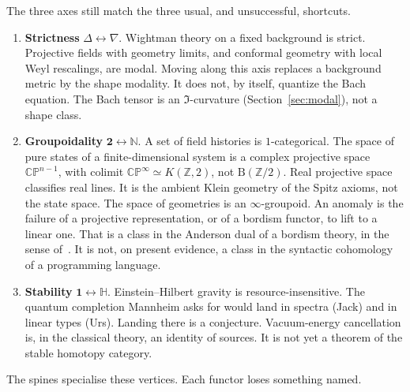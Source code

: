 \documentclass{article}
\theoremstyle{definition}
\begin{document}
The three axes still match the three usual, and unsuccessful, shortcuts.

\begin{enumerate}[label=\arabic*.]
  \item \textbf{Strictness} \(\Delta\leftrightarrow\nabla\).
        Wightman theory on a fixed background is strict.  Projective fields
        with geometry limits, and conformal geometry with local Weyl
        rescalings, are modal.  Moving along this axis replaces a background
        metric by the shape modality.  It does not, by itself, quantize the
        Bach equation.  The Bach tensor is an \(\Im\)-curvature
        (Section~\ref{sec:modal}), not a shape class.
  \item \textbf{Groupoidality} \(\mathbf{2}\leftrightarrow\mathbb{N}\).
        A set of field histories is \(1\)-categorical.  The space of pure
        states of a finite-dimensional system is a complex projective space
        \(\mathbb{CP}^{n-1}\), with colimit
        \(\mathbb{CP}^{\infty}\simeq K(\mathbb{Z},2)\), not
        \(\mathrm{B}(\mathbb{Z}/2)\).  Real projective space classifies real
        lines.  It is the ambient Klein geometry of the Spitz axioms, not the
        state space.  The space of geometries is an \(\infty\)-groupoid.  An anomaly is the failure of a projective
        representation, or of a bordism functor, to lift to a linear one.  That
        is a class in the Anderson dual of a bordism theory, in the sense
        of~\cite{FreedHopkins}.  It is not, on present evidence, a class in
        the syntactic cohomology of a programming language.
  \item \textbf{Stability} \(\mathbf{1}\leftrightarrow\mathbb{H}\).
        Einstein--Hilbert gravity is resource-insensitive.  The quantum
        completion Mannheim asks for would land in spectra (Jack) and in
        linear types (Urs).  Landing there is a conjecture.  Vacuum-energy
        cancellation is, in the classical theory, an identity of sources.  It
        is not yet a theorem of the stable homotopy category.
\end{enumerate}

The spines specialise these vertices.  Each functor loses something named.
\end{document}
